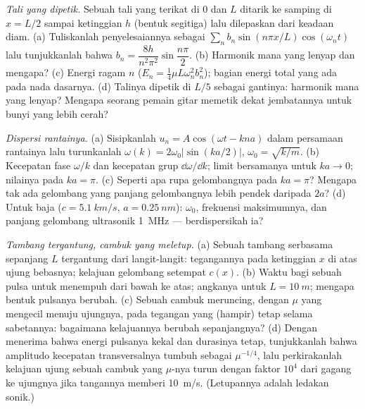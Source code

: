 \begin{exercise}[$\star\star\star$]\label{exo:b2:waves-on-strings:10}
\emph{Tali yang dipetik.} Sebuah tali yang terikat di $0$ dan $L$ ditarik ke samping
di $x = L/2$ sampai ketinggian $h$ (bentuk segitiga) lalu dilepaskan dari keadaan diam.
(a) Tuliskanlah penyelesaiannya sebagai $\sum_nb_n\sin(n\pi x/L)\cos(\omega_nt)$ lalu tunjukkanlah
bahwa $b_n = \dfrac{8h}{n^2\pi^2}\sin\dfrac{n\pi}2$. (b) Harmonik mana yang
lenyap dan mengapa? (c) Energi ragam $n$ ($E_n = \tfrac14\mu L\omega_n^2b_n^2$);
bagian energi total yang ada pada nada dasarnya. (d) Talinya dipetik di
$L/5$ sebagai gantinya: harmonik mana yang lenyap? Mengapa seorang pemain gitar memetik dekat
jembatannya untuk bunyi yang lebih cerah?
\end{exercise}

\begin{exercise}[$\star\star\star$]\label{exo:b2:waves-on-strings:11}
\emph{Dispersi rantainya.} (a) Sisipkanlah $u_n = A\cos(\omega t - kna)$ dalam
persamaan rantainya lalu turunkanlah $\omega(k) = 2\omega_0|\sin(ka/2)|$, $\omega_0 =
\sqrt{k/m}$. (b) Kecepatan fase $\omega/k$ dan kecepatan grup $\dd\omega/\dd k$;
limit bersamanya untuk $ka \to 0$; nilainya pada $ka = \pi$. (c) Seperti apa
rupa gelombangnya pada $ka = \pi$? Mengapa tak ada gelombang yang
panjang gelombangnya lebih pendek daripada $2a$? (d) Untuk baja ($c = \qty{5.1}{km/s}$, $a =
\qty{0.25}{nm}$): $\omega_0$, frekuensi maksimumnya, dan panjang gelombang ultrasonik
\qty{1}{MHz} --- berdispersikah ia?
\end{exercise}

\begin{exercise}[$\star\star\star$]\label{exo:b2:waves-on-strings:12}
\emph{Tambang tergantung, cambuk yang meletup.} (a) Sebuah tambang serbasama sepanjang $L$
tergantung dari langit-langit: tegangannya pada ketinggian $x$ di atas ujung bebasnya;
kelajuan gelombang setempat $c(x)$. (b) Waktu bagi sebuah pulsa untuk menempuh dari bawah ke
atas; angkanya untuk $L = \qty{10}{m}$; mengapa bentuk pulsanya berubah. (c) Sebuah
cambuk meruncing, dengan $\mu$ yang mengecil menuju ujungnya, pada tegangan yang (hampir)
tetap selama sabetannya: bagaimana kelajuannya berubah sepanjangnya? (d)
Dengan menerima bahwa energi pulsanya kekal dan durasinya
tetap, tunjukkanlah bahwa amplitudo kecepatan transversalnya
tumbuh sebagai $\mu^{-1/4}$, lalu perkirakanlah kelajuan ujung sebuah cambuk yang
$\mu$-nya turun dengan faktor $10^4$ dari gagang ke ujungnya jika tangannya memberi
\qty{10}{m/s}. (Letupannya adalah ledakan sonik.)
\end{exercise}

